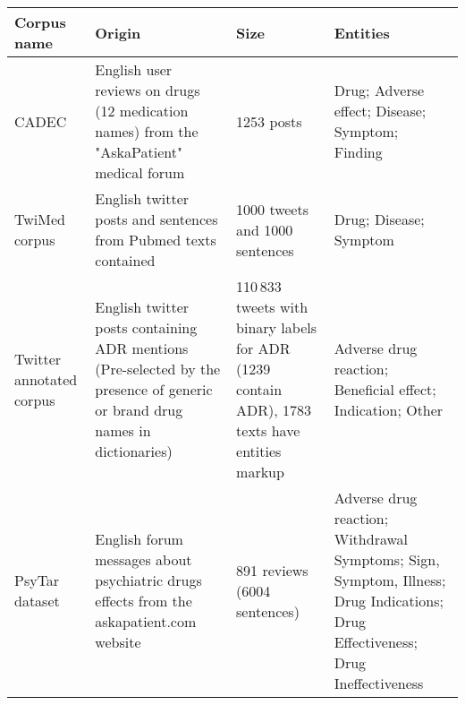 \begin{tabular}{|p{}|p{}|p{}|p{}|} 
\\ \hline
\textbf{Corpus name}                                                 & \textbf{Origin}                                                                                                                                                                                  & \textbf{Size}                                                                                                                              & \textbf{Entities}                                                                                                                                                           \\ \hline
CADEC \cite{karimi2015cadec}                        & English user reviews on drugs (12 medication names) from the "AskaPatient" medical forum
& 1253 posts
& Drug; Adverse effect; Disease; Symptom; Finding 
\\ \hline

TwiMed corpus \cite{alvaro2017twimed}               & English twitter posts and sentences from Pubmed texts contained                                                                                                                                  & 1000 tweets and 1000  sentences                                                                                                           & Drug; Disease; Symptom                                                                                                                                                      \\ \hline
Twitter annotated corpus \cite{sarker2016social}    & English twitter posts containing ADR mentions (Pre-selected by the presence of generic or brand drug names in dictionaries)                                                                          & 110\,833 tweets with binary labels for ADR (1239 contain ADR), 1783 texts have entities markup                                             & Adverse drug reaction; Beneficial effect; Indication; Other                                                                                                                 \\ \hline
PsyTar dataset \cite{zolnoori2019psytar}            & English forum messages about psychiatric drugs effects from the askapatient.com website                                                                                                                 & 891 reviews (6004 sentences)                                                                                                               & Adverse drug reaction; Withdrawal Symptoms; Sign, Symptom, Illness; Drug Indications; Drug Effectiveness; Drug Ineffectiveness                                              \\ \hline
\end{tabular}